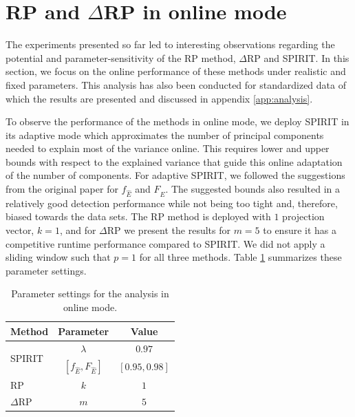 \section{RP and \texorpdfstring{$\Delta$RP}{deltaRP} in online mode}
\label{sec:analysis_worm}

The experiments presented so far led to interesting observations regarding the potential and parameter-sensitivity of the RP method, $\Delta$RP and SPIRIT. In this section, we focus on the online performance of these methods under realistic and fixed parameters. This analysis has also been conducted for standardized data of which the results are presented and discussed in appendix \ref{app:analysis}.

To observe the performance of the methods in online mode, we deploy SPIRIT in its adaptive mode which approximates the number of principal components needed to explain most of the variance online. This requires lower and upper bounds with respect to the explained variance that guide this online adaptation of the number of components. For adaptive SPIRIT, we followed the suggestions from the original paper \cite{papadimitriou2005streaming} for $f_{\hat{E}}$ and $F_{\hat{E}}$. The suggested bounds also resulted in a relatively good detection performance while not being too tight and, therefore, biased towards the data sets. The RP method is deployed with $1$ projection vector, $k=1$, and for $\Delta$RP we present the results for $m=5$ to ensure it has a competitive runtime performance compared to SPIRIT. We did not apply a sliding window such that $p=1$ for all three methods. Table \ref{tab:analysis_parameters} summarizes these parameter settings. 

\begin{table}[h]
	\centering
	\caption{Parameter settings for the analysis in online mode.}
	\label{tab:analysis_parameters}
	\vspace{-0.05cm}
	\begin{tabular}{l c c}
		\toprule	
		\textbf{Method}					& \textbf{Parameter}		& \textbf{Value}		\\
		\midrule
		\multirow{2}{*}{SPIRIT} & $\lambda$				&$	0.97	$	\\
								& $[f_{\hat{E}}, F_{\hat{E}}]$	&	$[0.95, 0.98]$ \\	
		\midrule
		RP				& $k$						&	$1$			\\	
		$\Delta$RP		& $m$						&	$5$			\\	
		\bottomrule		
	\end{tabular}
\end{table}
\vspace{-0.05cm}

